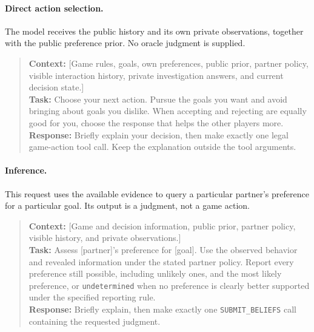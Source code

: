 \paragraph{Direct action selection.}
The model receives the public history and its own private observations,
together with the public preference prior. No oracle judgment is supplied.
\begin{quote}\small
\textbf{Context:} [Game rules, goals, own preferences, public prior, partner
policy, visible interaction history, private investigation answers, and
current decision state.]\\[2pt]
\textbf{Task:} Choose your next action. Pursue the goals you want and avoid
bringing about goals you dislike. When accepting and rejecting are equally
good for you, choose the response that helps the other players more.\\[2pt]
\textbf{Response:} Briefly explain your decision, then make exactly one legal
game-action tool call. Keep the explanation outside the tool arguments.
\end{quote}

\paragraph{Inference.}
This request uses the available evidence to query a particular partner's
preference for a particular goal. Its output is a judgment, not a game action.
\begin{quote}\small
\textbf{Context:} [Game and decision information, public prior, partner
policy, visible history, and private observations.]\\[2pt]
\textbf{Task:} Assess [partner]'s preference for [goal]. Use the observed
behavior and revealed information under the stated partner policy. Report
every preference still possible, including unlikely ones, and the most likely
preference, or \texttt{undetermined} when no preference is clearly better
supported under the specified reporting rule.\\[2pt]
\textbf{Response:} Briefly explain, then make exactly one
\texttt{SUBMIT\_BELIEFS} call containing the requested judgment.
\end{quote}

